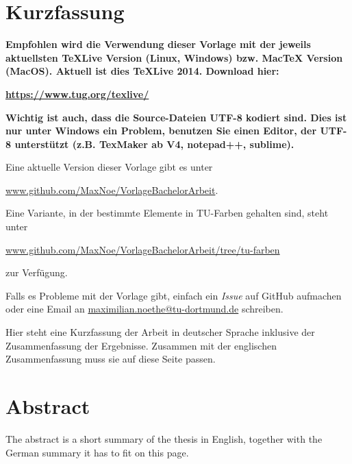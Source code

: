 \thispagestyle{plain}
\section*{Kurzfassung}

\textbf{\large Empfohlen wird die Verwendung dieser Vorlage mit der jeweils aktuellsten TeXLive Version (Linux, Windows) bzw. MacTeX Version (MacOS).
Aktuell ist dies TeXLive 2014. Download hier: 
}

\href{https://www.tug.org/texlive/}{\textbf{\large https://www.tug.org/texlive/}}

\textbf{\large
Wichtig ist auch, dass die Source-Dateien UTF-8 kodiert sind. Dies
ist nur unter Windows ein Problem, benutzen Sie einen Editor, der
UTF-8 unterstützt (z.B. TexMaker ab V4, notepad++, sublime).
}

Eine aktuelle Version dieser Vorlage gibt es unter 

\href{https://github.com/MaxNoe/VorlageBachelorArbeit}{www.github.com/MaxNoe/VorlageBachelorArbeit}.

Eine Variante, in der bestimmte Elemente in TU-Farben gehalten sind, steht unter 

\href{https://github.com/MaxNoe/VorlageBachelorArbeit/tree/tu-farben}{www.github.com/MaxNoe/VorlageBachelorArbeit/tree/tu-farben}  

zur Verfügung.

Falls es Probleme mit der Vorlage gibt, einfach ein \emph{Issue} auf GitHub aufmachen oder eine Email an
\href{mailto:maximilian.noethe@tu-dortmund.de}{maximilian.noethe@tu-dortmund.de} schreiben.


Hier steht eine Kurzfassung der Arbeit in deutscher Sprache inklusive der Zusammenfassung der
Ergebnisse.
Zusammen mit der englischen Zusammenfassung muss sie auf diese Seite passen.

\section*{Abstract}

The abstract is a short summary of the thesis in English, together with the German summary it has to fit on this page.
